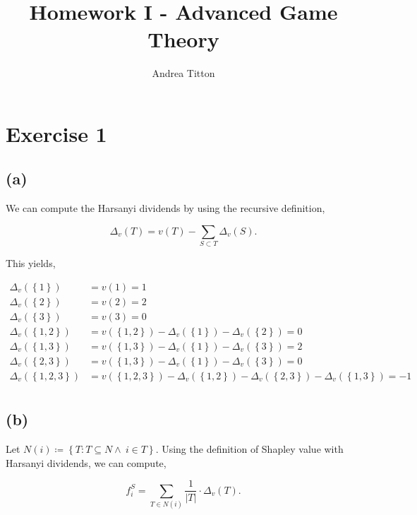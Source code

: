 \documentclass[american]{scrartcl}
\title{Homework I - Advanced Game Theory }
\author{Andrea Titton}
\newcommand{\set}[1]{\left\{#1\right\}}
\newcommand{\abs}[1]{\left\lvert #1 \right\rvert}
\begin{document}

\maketitle

\section*{Exercise 1}

\subsection*{(a)}

We can compute the Harsanyi dividends by using the recursive definition,

\begin{equation}
    \Delta_v(T) = v(T) - \sum_{S \subset T} \Delta_v(S).
\end{equation}

This yields,

\begin{equation}
    \begin{split}
        \Delta_v(\set{1}) &= v(1) = 1 \\
        \Delta_v(\set{2}) &= v(2) = 2 \\
        \Delta_v(\set{3}) &= v(3) = 0 \\
        \Delta_v(\set{1, 2}) &= v(\set{1, 2}) - \Delta_v(\set{1}) - \Delta_v(\set{2}) = 0 \\
        \Delta_v(\set{1, 3}) &= v(\set{1, 3}) - \Delta_v(\set{1}) - \Delta_v(\set{3}) = 2 \\
        \Delta_v(\set{2, 3}) &= v(\set{1, 3}) - \Delta_v(\set{1}) - \Delta_v(\set{3}) = 0 \\
        \Delta_v(\set{1, 2, 3}) &= v(\set{1, 2, 3}) - \Delta_v(\set{1, 2}) - \Delta_v(\set{2, 3}) - \Delta_v(\set{1, 3}) = -1  \\
    \end{split}
\end{equation}

\subsection*{(b)}
Let $N(i) \coloneqq \set{T: T \subseteq N \land \ i \in T}$. Using the definition of Shapley value with Harsanyi dividends, we can compute,

\begin{equation} \label{shapley}
    f_i^S = \sum_{T \in N(i)} \frac{1}{\abs{T}} \cdot \Delta_v(T).
\end{equation}
\end{document}
